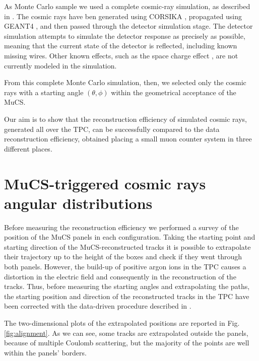 \documentclass[a4paper]{scrartcl}
\begin{document}
As Monte Carlo sample we used a complete cosmic-ray simulation, as described in \cite{cosmic}. The cosmic rays have ben generated using CORSIKA \cite{corsika},  propagated using GEANT4 \cite{geant}, and then passed through the detector simulation stage. The detector simulation attempts to simulate the detector response as precisely as possible, meaning that the current state of the detector is reflected, including known missing wires. Other known effects, such as the space charge effect \cite{sce}, are not currently modeled in the simulation.

From this complete Monte Carlo simulation, then, we selected only the cosmic rays with a starting angle $(\theta,\phi)$ within the geometrical acceptance of the MuCS.

Our aim is to show that the reconstruction efficiency of simulated cosmic rays, generated all over the TPC, can be successfully compared to the data reconstruction efficiency, obtained placing a small muon counter system in three different places.

\section{MuCS-triggered cosmic rays angular distributions}\label{sec:flux}
Before measuring the reconstruction efficiency we performed a survey of the position of the MuCS panels in each configuration. Taking the starting point and starting direction of the MuCS-reconstructed tracks it is possible to extrapolate their trajectory up to the height of the boxes and check if they went through both panels. However, the build-up of positive argon ions in the TPC causes a distortion in the electric field and consequently in the reconstruction of the tracks. Thus, before measuring the starting angles and extrapolating the paths, the starting position and direction of the reconstructed tracks in the TPC have been corrected with the data-driven procedure described in \cite{sce}.

The two-dimensional plots of the extrapolated positions are reported in Fig. \ref{fig:alignment}. As we can see, some tracks are extrapolated outside the panels, because of multiple Coulomb scattering, but the majority of the points are well within the panels' borders.
\end{document}
